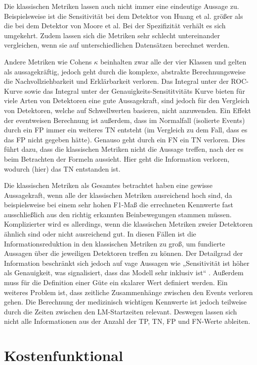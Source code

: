 Die klassischen Metriken lassen auch nicht immer eine eindeutige Aussage zu. Beispielsweise ist die Sensitivität bei dem Detektor von Huang et al. größer als die bei dem Detektor von Moore et al. Bei der Spezifizität verhält es sich umgekehrt. 
Zudem lassen sich die Metriken sehr schlecht untereinander vergleichen, wenn sie auf unterschiedlichen Datensätzen berechnet werden. \cite{jamareyna} 

Andere Metriken wie Cohens $\kappa$ beinhalten zwar alle der vier Klassen und gelten als aussagekräftig, jedoch geht durch die komplexe, abstrakte Berechnungsweise die Nachvollziehbarkeit und Erklärbarkeit verloren.
Das Integral unter der ROC-Kurve sowie das Integral unter der Genauigkeits-Sensititvitäts Kurve bieten für viele Arten von Detektoren eine gute Aussagekraft, sind jedoch für den Vergleich von Detektoren, welche auf Schwellwerten basieren, nicht anzuwenden.
Ein Effekt der eventweisen Berechnung ist außerdem, dass im Normalfall (isolierte Events) durch ein FP immer ein weiteres TN entsteht (im Vergleich zu dem Fall, dass es das FP nicht gegeben hätte). Genauso geht durch ein FN ein TN verloren. 
Dies führt dazu, dass die klassischen Metriken nicht die Aussage treffen, nach der es beim Betrachten der Formeln aussieht. Hier geht die Information verloren, wodurch (hier) das TN entstanden ist.

Die klassischen Metriken als Gesamtes betrachtet haben eine gewisse Aussagekraft, wenn alle der klassischen Metriken ausreichend hoch sind, da beispielsweise bei einem sehr hohen F1-Maß die errechneten Kennwerte fast ausschließlich aus den richtig erkannten Beinbewegungen stammen müssen. Komplizierter wird es allerdings, wenn die klassischen Metriken zweier Detektoren ähnlich sind oder nicht ausreichend gut. In diesen Fällen ist die Informationsreduktion in den klassischen Metriken zu groß, um fundierte Aussagen über die jeweiligen Detektoren treffen zu können.
Der Detailgrad der Information beschränkt sich jedoch auf vage Aussagen wie „Sensitivität ist höher als Genauigkeit, was signalisiert, dass das Modell sehr inklusiv ist“ \cite{Carvelli}.
Außerdem muss für die Definition einer Güte ein skalarer Wert definiert werden. 
Ein weiteres Problem ist, dass zeitliche Zusammenhänge zwischen den Events verloren gehen. Die Berechnung der medizinisch wichtigen Kennwerte ist jedoch teilweise durch die Zeiten zwischen den LM-Startzeiten relevant. Deswegen lassen sich nicht alle Informationen aus der Anzahl der TP, TN, FP und FN-Werte ableiten.

\section{Kostenfunktional}

